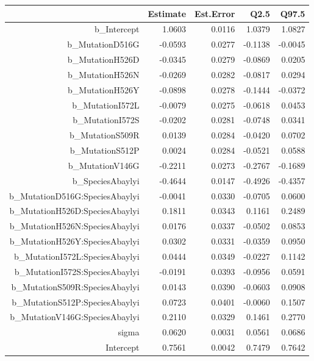 \begin{table}[ht]
\centering
\begin{tabular}{rrrrr}
  \hline
 & Estimate & Est.Error & Q2.5 & Q97.5 \\ 
  \hline
b\_Intercept & 1.0603 & 0.0116 & 1.0379 & 1.0827 \\ 
  b\_MutationD516G & -0.0593 & 0.0277 & -0.1138 & -0.0045 \\ 
  b\_MutationH526D & -0.0345 & 0.0279 & -0.0869 & 0.0205 \\ 
  b\_MutationH526N & -0.0269 & 0.0282 & -0.0817 & 0.0294 \\ 
  b\_MutationH526Y & -0.0898 & 0.0278 & -0.1444 & -0.0372 \\ 
  b\_MutationI572L & -0.0079 & 0.0275 & -0.0618 & 0.0453 \\ 
  b\_MutationI572S & -0.0202 & 0.0281 & -0.0748 & 0.0341 \\ 
  b\_MutationS509R & 0.0139 & 0.0284 & -0.0420 & 0.0702 \\ 
  b\_MutationS512P & 0.0024 & 0.0284 & -0.0521 & 0.0588 \\ 
  b\_MutationV146G & -0.2211 & 0.0273 & -0.2767 & -0.1689 \\ 
  b\_SpeciesAbaylyi & -0.4644 & 0.0147 & -0.4926 & -0.4357 \\ 
  b\_MutationD516G:SpeciesAbaylyi & -0.0041 & 0.0330 & -0.0705 & 0.0600 \\ 
  b\_MutationH526D:SpeciesAbaylyi & 0.1811 & 0.0343 & 0.1161 & 0.2489 \\ 
  b\_MutationH526N:SpeciesAbaylyi & 0.0176 & 0.0337 & -0.0502 & 0.0853 \\ 
  b\_MutationH526Y:SpeciesAbaylyi & 0.0302 & 0.0331 & -0.0359 & 0.0950 \\ 
  b\_MutationI572L:SpeciesAbaylyi & 0.0444 & 0.0349 & -0.0227 & 0.1142 \\ 
  b\_MutationI572S:SpeciesAbaylyi & -0.0191 & 0.0393 & -0.0956 & 0.0591 \\ 
  b\_MutationS509R:SpeciesAbaylyi & 0.0143 & 0.0390 & -0.0603 & 0.0908 \\ 
  b\_MutationS512P:SpeciesAbaylyi & 0.0723 & 0.0401 & -0.0060 & 0.1507 \\ 
  b\_MutationV146G:SpeciesAbaylyi & 0.2110 & 0.0329 & 0.1461 & 0.2770 \\ 
  sigma & 0.0620 & 0.0031 & 0.0561 & 0.0686 \\ 
  Intercept & 0.7561 & 0.0042 & 0.7479 & 0.7642 \\ 

\end{tabular}
\end{table}
